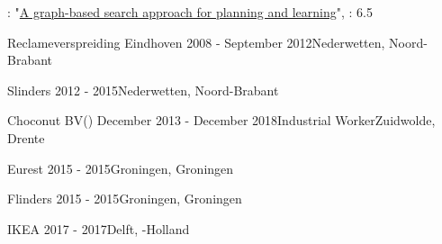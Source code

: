 \begin{rSection}{}
  \begin{experienceItem}
    {}{}{: "\href{https://repository.tudelft.nl/islandora/object/uuid\%3Af988aaf6-c2a7-4782-b5de-8ca6187d03ef?collection=education}{A graph-based search approach for planning and learning}", : 6.5} {}
  \end{experienceItem}
\end{rSection}

\begin{rSection}{}
  \begin{experienceItem}
    {Reclameverspreiding Eindhoven}{ 2008 - September 2012}{}{Nederwetten, Noord-Brabant}
  \end{experienceItem}

  \begin{experienceItem}
    {Slinders}{ 2012 -  2015}{{}}{Nederwetten, Noord-Brabant}
  \end{experienceItem}

  \begin{experienceItem}
    {Choconut BV}{() December 2013 - December 2018}{Industrial Worker}{Zuidwolde, Drente}
  \end{experienceItem}

  \begin{experienceItem}
    {Eurest}{ 2015 -  2015}{}{Groningen, Groningen}
  \end{experienceItem}

  \begin{experienceItem}
    {Flinders}{ 2015 -  2015}{}{Groningen, Groningen}
  \end{experienceItem}

  \begin{experienceItem}
    {IKEA}{ 2017 -  2017}{}{Delft, -Holland}
  \end{experienceItem}


\end{rSection}
